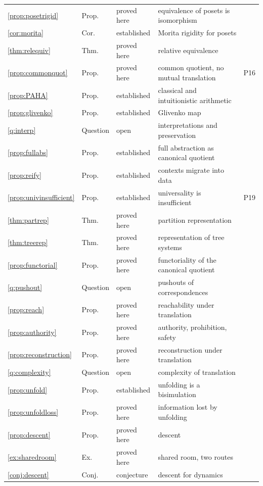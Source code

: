\documentclass[11pt]{article}
\theoremstyle{definition}
\theoremstyle{remark}
\begin{document}
\begin{center}
\begin{longtable}{lllp{5.3cm}l}
\ref{prop:posetrigid} & Prop. & proved here & equivalence of posets is isomorphism & \\
\ref{cor:morita} & Cor. & established & Morita rigidity for posets & \\
\ref{thm:relequiv} & Thm. & proved here & relative equivalence & \\
\ref{prop:commonquot} & Prop. & proved here & common quotient, no mutual translation & P16\\
\ref{prop:PAHA} & Prop. & established & classical and intuitionistic arithmetic & \\
\ref{prop:glivenko} & Prop. & established & Glivenko map & \\
\ref{q:interp} & Question & open & interpretations and preservation & \\
\ref{prop:fullabs} & Prop. & established & full abstraction as canonical quotient & \\
\ref{prop:reify} & Prop. & established & contexts migrate into data & \\
\ref{prop:univinsufficient} & Prop. & established & universality is insufficient & P19\\
\ref{thm:partrep} & Thm. & proved here & partition representation & \\
\ref{thm:treerep} & Thm. & proved here & representation of tree systems & \\
\ref{prop:functorial} & Prop. & proved here & functoriality of the canonical quotient & \\
\ref{q:pushout} & Question & open & pushouts of correspondences & \\
\ref{prop:reach} & Prop. & proved here & reachability under translation & \\
\ref{prop:authority} & Prop. & proved here & authority, prohibition, safety & \\
\ref{prop:reconstruction} & Prop. & proved here & reconstruction under translation & \\
\ref{q:complexity} & Question & open & complexity of translation & \\
\ref{prop:unfold} & Prop. & established & unfolding is a bisimulation & \\
\ref{prop:unfoldloss} & Prop. & proved here & information lost by unfolding & \\
\ref{prop:descent} & Prop. & proved here & descent & \\
\ref{ex:sharedroom} & Ex. & proved here & shared room, two routes & \\
\ref{conj:descent} & Conj. & conjecture & descent for dynamics & \\
\bottomrule
\end{longtable}
\end{center}
\end{document}
